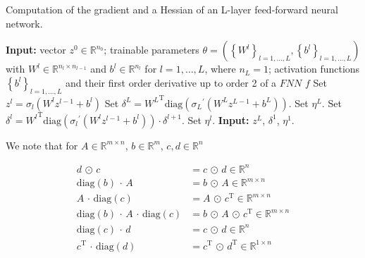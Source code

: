 \begin{algorithm}[H]
    \caption{Computation of the gradient and a Hessian of an L-layer feed-forward neural network.}
    \begin{algorithmic}[1]
        \State \textbf{Input:} vector $z^0 \in \mathbb{R}^{n_0}$; trainable parameters $\theta = \left(\left\{ W^l \right\}_{l = 1, \ldots, L}, \left\{ b^l \right\}_{l = 1, \ldots, L}\right)$ with $W^l \in \mathbb{R}^{n_l \times n_{l-1}}$ and $b^l \in \mathbb{R}^{n_l}$ for $l = 1, \ldots, L$, where $n_L = 1$; activation functions $\left\{ b^l \right\}_{l = 1, \ldots, L}$ and their first order derivative up to order 2 of a $FNN$ $f$
            \State Set $z^l = \sigma_l\left(W^l z^{l-1} + b^l\right)$
        \EndFor
        \State Set $\delta^{L} = {W^{L}}^{\mathrm{T}} \mathrm{diag}\left({\sigma_{L}}^{\prime}\left(W^{L} z^{L-1} + b^{L}\right)\right)$.
        \State Set $\eta^{L}$.
            \State Set $\delta^{l} = {W^{l}}^{\mathrm{T}} \mathrm{diag}\left({\sigma_{l}}^{\prime}\left(W^{l} z^{l-1} + b^{l}\right)\right) \cdot \delta^{l+1}$.
            \State Set $\eta^{l}$.
        \EndFor
        \State \textbf{Input:} $z^L$, $\delta^1$, $\eta^1$.
    \end{algorithmic}
\end{algorithm}




  






We note that for $A \in \mathbb{R}^{m \times n}$, $b \in \mathbb{R}^{m}$, $c, d \in \mathbb{R}^{n}$

\begin{align*}
    d \, \odot \, c &= c \, \odot \, d \in \mathbb{R}^{n} \\
    \mathrm{diag}\left(b\right) \, \cdot \, A &= b \, \odot \, A \in \mathbb{R}^{m \times n} \\
    A \, \cdot \, \mathrm{diag}\left(c\right) &= A \, \odot \, c^{\mathrm{T}} \in \mathbb{R}^{m \times n} \\
    \mathrm{diag}\left(b\right) \, \cdot \, A \, \cdot \, \mathrm{diag}\left(c\right) &= b \, \odot \, A \, \odot \, c^{\mathrm{T}} \in \mathbb{R}^{m \times n} \\
    \mathrm{diag}\left(c\right) \, \cdot \, d &= c \, \odot \, d \in \mathbb{R}^{n} \\
    c^{\mathrm{T}} \, \cdot \, \mathrm{diag}\left(d\right) &= c^{\mathrm{T}} \, \odot \, d^{\mathrm{T}} \in \mathbb{R}^{1 \times n} \\
\end{align*}







